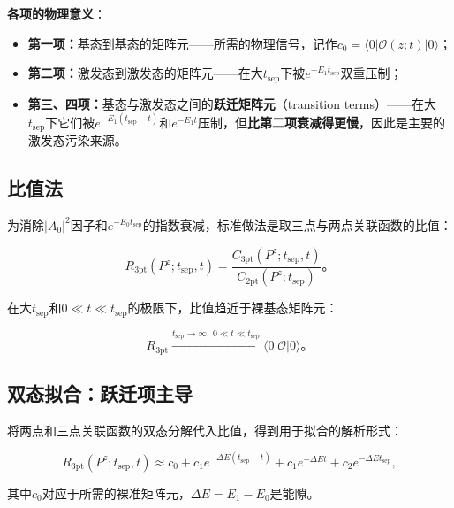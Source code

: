 \documentclass[12pt,a4paper]{ctexart}
\theoremstyle{definition}
\begin{document}
\textbf{各项的物理意义}\cite{Chen2025gluon}：
\begin{itemize}
    \item \textbf{第一项：}基态到基态的矩阵元——所需的物理信号，记作$c_0 = \langle 0|\mathcal{O}(z;t)|0\rangle$；
    \item \textbf{第二项：}激发态到激发态的矩阵元——在大$t_{\text{sep}}$下被$e^{-E_1 t_{\text{sep}}}$双重压制；
    \item \textbf{第三、四项：}基态与激发态之间的\textbf{跃迁矩阵元}（transition terms）——在大$t_{\text{sep}}$下它们被$e^{-E_1(t_{\text{sep}}-t)}$和$e^{-E_1 t}$压制，但\textbf{比第二项衰减得更慢}，因此是主要的激发态污染来源。
\end{itemize}

\subsection{比值法}

为消除$|A_0|^2$因子和$e^{-E_0 t_{\text{sep}}}$的指数衰减，标准做法是取三点与两点关联函数的比值\cite{Chen2025gluon}：

\begin{equation}
\boxed{R_{\text{3pt}}(P^z; t_{\text{sep}}, t) = \frac{C_{\text{3pt}}(P^z; t_{\text{sep}}, t)}{C_{\text{2pt}}(P^z; t_{\text{sep}})}}。
\label{eq:ratio_3pt_2pt}
\end{equation}

在大$t_{\text{sep}}$和$0 \ll t \ll t_{\text{sep}}$的极限下，比值趋近于裸基态矩阵元：

\begin{equation}
R_{\text{3pt}} \xrightarrow{t_{\text{sep}} \to \infty,\; 0 \ll t \ll t_{\text{sep}}} \langle 0|\mathcal{O}|0\rangle。
\label{eq:ratio_limit}
\end{equation}

\subsection{双态拟合：跃迁项主导}

将两点和三点关联函数的双态分解代入比值，得到用于拟合的解析形式\cite{Chen2025gluon}：

\begin{equation}
\boxed{R_{\text{3pt}}(P^z; t_{\text{sep}}, t) \approx c_0 + c_1 e^{-\Delta E(t_{\text{sep}}-t)} + c_1 e^{-\Delta E t} + c_2 e^{-\Delta E t_{\text{sep}}}},
\label{eq:two_state_fit_full}
\end{equation}

其中$c_0$对应于所需的裸准矩阵元，$\Delta E = E_1 - E_0$是能隙。
\end{document}

